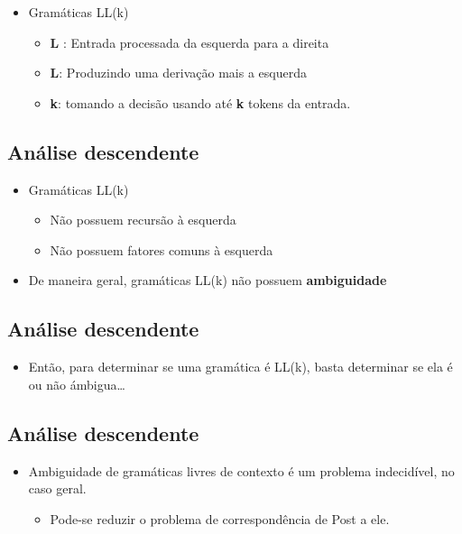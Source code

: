 \documentclass[11pt]{article}
\begin{document}
\begin{itemize}
\item Gramáticas LL(k)
\begin{itemize}
\item \textbf{\textbf{L}} : Entrada processada da esquerda para a direita
\item \textbf{\textbf{L}}: Produzindo uma derivação mais a esquerda
\item \textbf{\textbf{k}}: tomando a decisão usando até \textbf{\textbf{k}} tokens da entrada.
\end{itemize}
\end{itemize}
\subsection*{Análise descendente}
\label{sec:orgb4e428d}

\begin{itemize}
\item Gramáticas LL(k)
\begin{itemize}
\item Não possuem recursão à esquerda
\item Não possuem fatores comuns à esquerda
\end{itemize}
\item De maneira geral, gramáticas LL(k) não possuem \textbf{\textbf{ambiguidade}}
\end{itemize}
\subsection*{Análise descendente}
\label{sec:org95324ed}

\begin{itemize}
\item Então, para determinar se uma gramática é LL(k), basta determinar se ela é ou não ámbigua\ldots{}
\end{itemize}
\subsection*{Análise descendente}
\label{sec:org75d977c}

\begin{itemize}
\item Ambiguidade de gramáticas livres de contexto é um problema indecidível, no caso geral.
\begin{itemize}
\item Pode-se reduzir o problema de correspondência de Post a ele.
\end{itemize}
\end{itemize}
\end{document}
